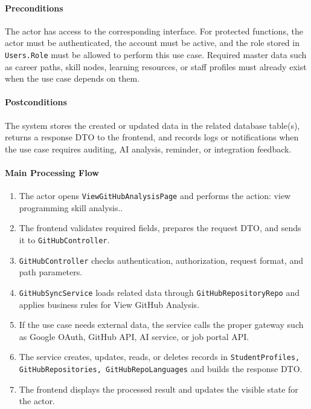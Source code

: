 \paragraph{Preconditions}

The actor has access to the corresponding interface. For protected functions, the actor must be authenticated, the account must be active, and the role stored in \texttt{Users.Role} must be allowed to perform this use case. Required master data such as career paths, skill nodes, learning resources, or staff profiles must already exist when the use case depends on them.

\paragraph{Postconditions}

The system stores the created or updated data in the related database table(s), returns a response DTO to the frontend, and records logs or notifications when the use case requires auditing, AI analysis, reminder, or integration feedback.

\paragraph{Main Processing Flow}

\begin{enumerate}
    \item The actor opens \texttt{ViewGitHubAnalysisPage} and performs the action: view programming skill analysis..
    \item The frontend validates required fields, prepares the request DTO, and sends it to \texttt{GitHubController}.
    \item \texttt{GitHubController} checks authentication, authorization, request format, and path parameters.
    \item \texttt{GitHubSyncService} loads related data through \texttt{GitHubRepositoryRepo} and applies business rules for View GitHub Analysis.
    \item If the use case needs external data, the service calls the proper gateway such as Google OAuth, GitHub API, AI service, or job portal API.
    \item The service creates, updates, reads, or deletes records in \texttt{StudentProfiles, GitHubRepositories, GitHubRepoLanguages} and builds the response DTO.
    \item The frontend displays the processed result and updates the visible state for the actor.
\end{enumerate}

